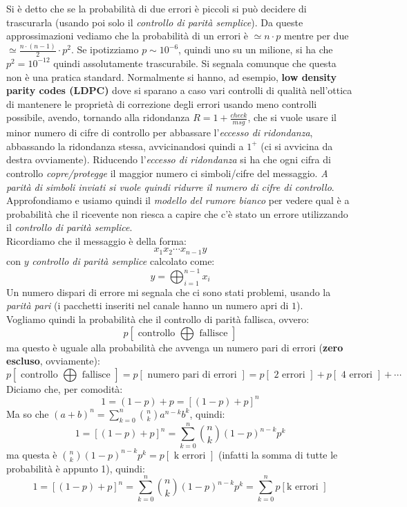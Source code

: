 \documentclass[a4paper,12pt, oneside]{book}
\begin{document}
Si è detto che se la probabilità di due errori è piccoli si può decidere di
trascurarla (usando poi solo il \textit{controllo di parità semplice}). Da
queste approssimazioni vediamo che la probabilità di un errori è $\simeq n\cdot
p$ mentre per due $\simeq\frac{n\cdot (n-1)}{2}\cdot p^2$. Se ipotizziamo $p\sim
10^{-6}$, quindi uno su un milione, si ha che $p^2=10^{-12}$ quindi assolutamente
trascurabile. Si segnala comunque che questa non è una pratica standard.
Normalmente si hanno, ad esempio, \textbf{low density parity codes (LDPC)} dove
si sparano a caso vari controlli di qualità nell'ottica di mantenere le
proprietà di correzione degli errori usando meno controlli possibile, avendo,
tornando alla ridondanza $R=1+\frac{check}{msg}$, che si vuole usare il minor
numero di cifre di controllo per abbassare l'\textit{eccesso di ridondanza},
abbassando la ridondanza stessa, avvicinandosi quindi a $1^+$ (ci si avvicina
da destra ovviamente). Riducendo l'\textit{eccesso di ridondanza} si ha che
ogni cifra di controllo \textit{copre/protegge} il maggior numero ci
simboli/cifre del messaggio. \textit{A parità di simboli inviati si vuole quindi
  ridurre il numero di cifre di controllo}.\\
Approfondiamo e usiamo quindi il\textit{ modello del rumore bianco} per vedere
qual è a probabilità che il ricevente non riesca a capire che c'è stato un
errore utilizzando il \textit{controllo di parità semplice}.\\
Ricordiamo che il messaggio è della forma:
\[x_1x_2\cdots x_{n-1}y\]
con $y$ \textit{controllo di parità semplice} calcolato come:
\[y=\bigoplus_{i=1}^{n-1}x_i\]
Un numero dispari di errore mi segnala che ci sono stati problemi, usando la
\textit{parità pari} (i pacchetti inseriti nel canale hanno un numero apri di
$1$).\\ 
Vogliamo quindi la probabilità che il controllo di parità fallisca, ovvero:
\[p[\mbox{ controllo }\bigoplus \mbox{ fallisce }]\]
ma questo è uguale alla probabilità che avvenga un numero pari di errori
(\textbf{zero escluso}, ovviamente):
{\footnotesize{\[p[\mbox{ controllo }\bigoplus \mbox{ fallisce }]=p[\mbox{ numero
      pari di errori }]=p[\mbox{ 2 errori }]+p[\mbox{ 4 errori }]+\cdots \]}}
Diciamo che, per comodità:
\[1=(1-p)+p=[(1-p)+p]^n\]
Ma so che $(a+b)^n=\sum_{k=0}^n{{n}\choose{k}}a^{n-k}b^k$, quindi:
\[1=[(1-p)+p]^n=\sum_{k=0}^n{{n}\choose{k}}(1-p)^{n-k}p^k\]
ma questa è ${{n}\choose{k}}(1-p)^{n-k}p^k=p[\mbox{ k errori }]$ (infatti la
somma di tutte le probabilità è appunto 1), quindi:
\[1=[(1-p)+p]^n=\sum_{k=0}^n{{n}\choose{k}}(1-p)^{n-k}p^k=\sum_{k=0}^np[\mbox{
    k errori }]\]
\end{document}
